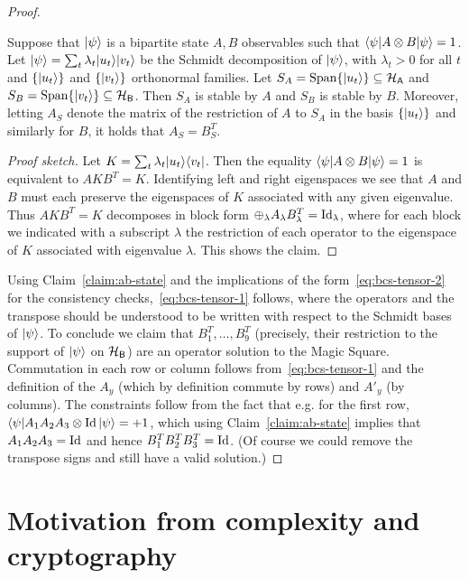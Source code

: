 \begin{proof}
\begin{claim}\label{claim:ab-state}
Suppose that $|\psi\rangle$ is a bipartite state $A,B$ observables such that $\langle\psi| A\otimes B |\psi\rangle = 1$. Let $|\psi\rangle = \sum_t \lambda_t |u_t\rangle |v_t\rangle$ be the Schmidt decomposition of $|\psi\rangle$, with $\lambda_t>0$ for all $t$ and $\{|u_t\rangle\}$ and $\{|v_t\rangle\}$ orthonormal families. Let  $S_A = \text{Span}\{|u_t\rangle\} \subseteq \mathcal{H}_{\textsf{A}}$ and $S_B=\text{Span}\{|v_t\rangle\} \subseteq \mathcal{H}_{\textsf{B}}$. Then $S_A$ is stable by $A$ and $S_B$ is stable by $B$. Moreover, letting $A_S$ denote the matrix of the restriction of $A$ to $S_A$ in the basis $\{|u_t\rangle\}$ and similarly for $B$, it holds that    $A_S=B_S^T$. 
\end{claim}

\begin{proof}[Proof sketch]
Let $K = \sum_t \lambda_t |u_t\rangle\langle v_t|$. Then the equality $\langle\psi| A\otimes B |\psi\rangle = 1$ is equivalent to $AKB^T = K$. Identifying left and right eigenspaces we see that $A$ and $B$ must each preserve the eigenspaces of $K$ associated with any given eigenvalue. Thus $AKB^T = K$ decomposes in block form $\oplus_\lambda  A_\lambda B_\lambda^T = \mathop{\rm Id}\nolimits_\lambda$, where for each block we indicated with a subscript $\lambda$ the restriction of each operator to the eigenspace of $K$ associated with eigenvalue $\lambda$. This shows the claim.  
\end{proof}

Using Claim~\ref{claim:ab-state} and the implications of the form~\eqref{eq:bcs-tensor-2} for the consistency checks,~\eqref{eq:bcs-tensor-1} follows, where the operators and the transpose should be understood to be written with respect to the Schmidt bases of $|\psi\rangle$. To conclude we claim that $B_1^T,\ldots,B_9^T$ (precisely, their restriction to the support of $|\psi\rangle$ on $\mathcal{H}_{\textsf{B}}$) are an operator solution to the Magic Square. Commutation in each row or column follows from~\eqref{eq:bcs-tensor-1} and the definition of the $A_y$ (which by definition commute by rows) and $A'_y$ (by columns). The constraints follow from the fact that e.g. for the first row, $\langle\psi| A_1 A_2 A_3 \otimes \mathop{\rm Id}\nolimits|\psi\rangle = +1$, which using Claim~\ref{claim:ab-state}  implies that $A_1A_2A_3 = \mathop{\rm Id}\nolimits$ and hence $B_1^T B_2^T B_3^T = \mathop{\rm Id}\nolimits$. (Of course we could remove the transpose signs and still have a valid solution.)
\end{proof}



\section{Motivation from complexity and cryptography}


